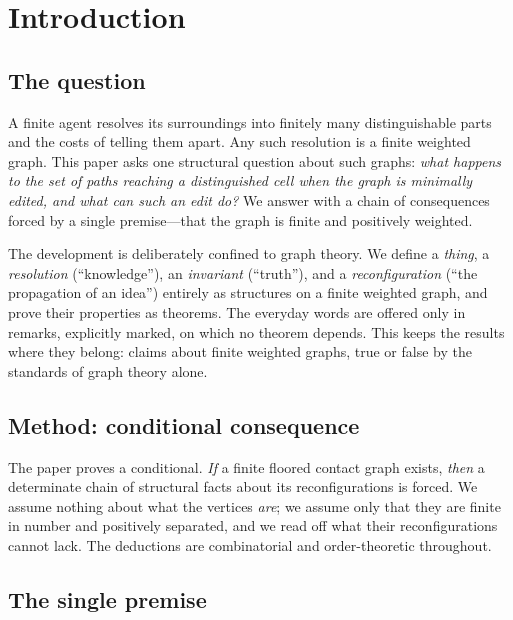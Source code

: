 \documentclass[11pt,a4paper]{article}
\theoremstyle{thmstyle}
\theoremstyle{definition}
\theoremstyle{remark}
\begin{document}
\tableofcontents

\section{Introduction}
\label{sec:intro}

\subsection{The question}

A finite agent resolves its surroundings into finitely many distinguishable
parts and the costs of telling them apart. Any such resolution is a finite
weighted graph. This paper asks one structural question about such graphs:
\emph{what happens to the set of paths reaching a distinguished cell when
the graph is minimally edited, and what can such an edit do?} We answer with
a chain of consequences forced by a single premise---that the graph is
finite and positively weighted.

The development is deliberately confined to graph theory. We define a
\emph{thing}, a \emph{resolution} (``knowledge''), an \emph{invariant}
(``truth''), and a \emph{reconfiguration} (``the propagation of an idea'')
entirely as structures on a finite weighted graph, and prove their
properties as theorems. The everyday words are offered only in remarks,
explicitly marked, on which no theorem depends. This keeps the results
where they belong: claims about finite weighted graphs, true or false by
the standards of graph theory alone.

\subsection{Method: conditional consequence}

The paper proves a conditional. \emph{If} a finite floored contact graph
exists, \emph{then} a determinate chain of structural facts about its
reconfigurations is forced. We assume nothing about what the vertices
\emph{are}; we assume only that they are finite in number and positively
separated, and we read off what their reconfigurations cannot lack. The
deductions are combinatorial and order-theoretic throughout.

\subsection{The single premise}
\end{document}
